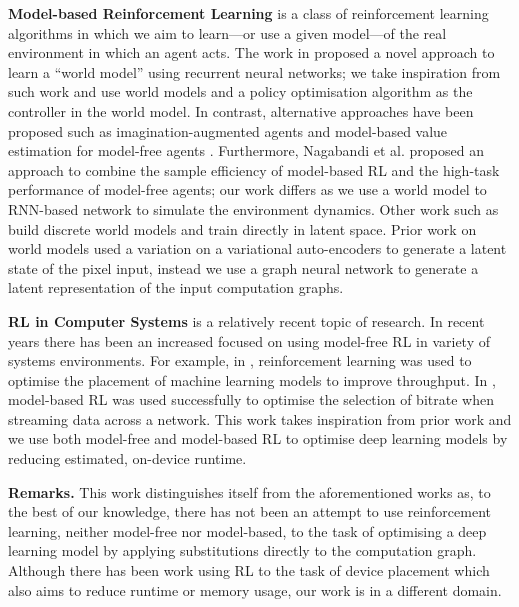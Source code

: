 
\textbf{Model-based Reinforcement Learning} is a class of reinforcement learning algorithms in which we aim to learn---or use a given model---of the real environment in which an agent acts. The work in \cite{ha2018worldmodels} proposed a novel approach to learn a ``world model'' using recurrent neural networks; we take inspiration from such work and use world models and a policy optimisation algorithm as the controller in the world model. In contrast, alternative approaches have been proposed such as imagination-augmented agents \cite{weber2018imaginationaugmented} and model-based value estimation for model-free agents \cite{feinberg2018modelbased}. Furthermore, Nagabandi et al. \cite{nagabandi2017neural} proposed an approach to combine the sample efficiency of model-based RL and the high-task performance of model-free agents; our work differs as we use a world model to RNN-based network to simulate the environment dynamics. Other work such as \cite{robine2021smaller, hafner2021mastering} build discrete world models and train directly in latent space. Prior work on world models used a variation on a variational auto-encoders \cite{ha2018worldmodels,hafner2020dream} to generate a latent state of the pixel input, instead we use a graph neural network \cite{battaglia2018relational} to generate a latent representation of the input computation graphs.

\textbf{RL in Computer Systems} is a relatively recent topic of research. In recent years there has been an increased focused on using model-free RL in variety of systems environments. For example, in \cite{mirhoseini2017device, mirhoseini2018hierarchical, addanki2019placeto, paliwal2020reinforced}, reinforcement learning was used to optimise the placement of machine learning models to improve throughput. In \cite{app10196685}, model-based RL was used successfully to optimise the selection of bitrate when streaming data across a network. This work takes inspiration from prior work and we use both model-free and model-based RL to optimise deep learning models by reducing estimated, on-device runtime.

\textbf{Remarks.} This work distinguishes itself from the aforementioned works as, to the best of our knowledge, there has not been an attempt to use reinforcement learning, neither model-free nor model-based, to the task of optimising a deep learning model by applying substitutions directly to the computation graph. Although there has been work using RL to the task of device placement \cite{addanki2019placeto, paliwal2020reinforced} which also aims to reduce runtime or memory usage, our work is in a different domain.

